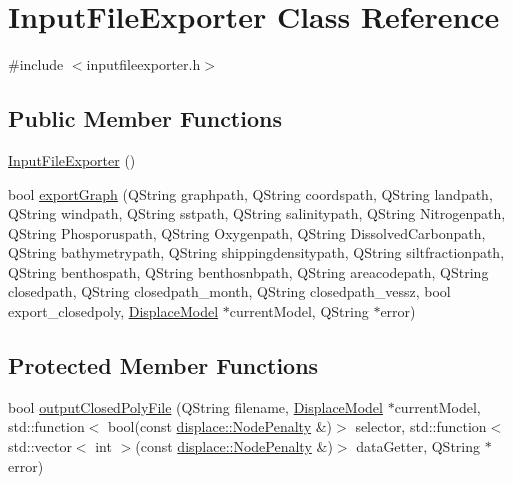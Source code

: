 \hypertarget{class_input_file_exporter}{}\section{Input\+File\+Exporter Class Reference}
\label{class_input_file_exporter}


{\ttfamily \#include $<$inputfileexporter.\+h$>$}

\subsection*{Public Member Functions}
\begin{DoxyCompactItemize}
\item 
\mbox{\hyperlink{class_input_file_exporter_a554611d1ad589abf1e81285e4b2a62a5}{Input\+File\+Exporter}} ()
\item 
bool \mbox{\hyperlink{class_input_file_exporter_ace1a69031a14390fee9281bda48b11c2}{export\+Graph}} (Q\+String graphpath, Q\+String coordspath, Q\+String landpath, Q\+String windpath, Q\+String sstpath, Q\+String salinitypath, Q\+String Nitrogenpath, Q\+String Phosporuspath, Q\+String Oxygenpath, Q\+String Dissolved\+Carbonpath, Q\+String bathymetrypath, Q\+String shippingdensitypath, Q\+String siltfractionpath, Q\+String benthospath, Q\+String benthosnbpath, Q\+String areacodepath, Q\+String closedpath, Q\+String closedpath\+\_\+month, Q\+String closedpath\+\_\+vessz, bool export\+\_\+closedpoly, \mbox{\hyperlink{class_displace_model}{Displace\+Model}} $\ast$current\+Model, Q\+String $\ast$error)
\end{DoxyCompactItemize}
\subsection*{Protected Member Functions}
\begin{DoxyCompactItemize}
\item 
bool \mbox{\hyperlink{class_input_file_exporter_a8d880853625219459c63fd5da193fa52}{output\+Closed\+Poly\+File}} (Q\+String filename, \mbox{\hyperlink{class_displace_model}{Displace\+Model}} $\ast$current\+Model, std\+::function$<$ bool(const \mbox{\hyperlink{classdisplace_1_1_node_penalty}{displace\+::\+Node\+Penalty}} \&)$>$ selector, std\+::function$<$ std\+::vector$<$ int $>$(const \mbox{\hyperlink{classdisplace_1_1_node_penalty}{displace\+::\+Node\+Penalty}} \&)$>$ data\+Getter, Q\+String $\ast$error)
\end{DoxyCompactItemize}


